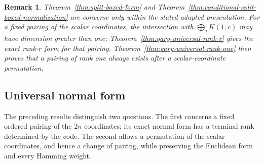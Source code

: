 \documentclass[12pt]{article}
\newtheorem{remark}[theorem]{Remark}
\begin{document}

\begin{remark}
\rm
Theorem~\ref{thm:split-boxed-form} and
Theorem~\ref{thm:conditional-split-boxed-normalization} are converse only
within the stated adapted presentation.  For a fixed pairing of the scalar
coordinates, the intersection with \(\bigoplus_jK(1,c)\) may have dimension
greater than one; Theorem~\ref{thm:qary-universal-rank-r} gives the exact
rank-\(r\) form for that pairing.  Theorem~\ref{thm:qary-universal-rank-one}
then proves that a pairing of rank one always exists after a
scalar-coordinate permutation.
\end{remark}

\subsection{Universal normal form}\label{sec:universal-normal-form}

The preceding results distinguish two questions.  The first concerns a
fixed ordered pairing of the \(2n\) coordinates; its exact normal form has a
terminal rank determined by the code.  The second allows a permutation of
the scalar coordinates, and hence a change of pairing, while preserving the
Euclidean form and every Hamming weight.
\end{document}
